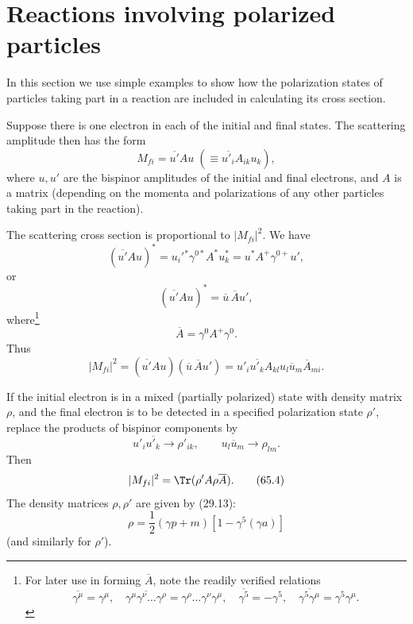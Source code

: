 \section{Reactions involving polarized particles}

In this section we use simple examples to show how the polarization states of particles taking part in a reaction are included in calculating its cross section.

Suppose there is one electron in each of the initial and final states. The scattering amplitude then has the form
\begin{equation}
M_{fi}=\overline{u'}Au\;(\equiv\overline{u'_i}A_{ik}u_k),
\tag{65.1}
\end{equation}
where $u,u'$ are the bispinor amplitudes of the initial and final electrons, and $A$ is a matrix (depending on the momenta and polarizations of any other particles taking part in the reaction).

The scattering cross section is proportional to $|M_{fi}|^2$. We have
\[
(\overline{u'}Au)^*=u_i'{}^*\gamma^{0*}A^*u_k^*=u^*A^+\gamma^{0+}u',
\]
or
\begin{equation}
(\overline{u'}Au)^*=\overline u\,\overline A u',
\tag{65.2}
\end{equation}
where\footnote{For later use in forming $\overline A$, note the readily verified relations
\begin{equation}
\overline{\gamma^\mu}=\gamma^\mu,\quad
\overline{\gamma^\mu\gamma^\nu\ldots\gamma^\rho}=\gamma^\rho\ldots\gamma^\nu\gamma^\mu,\quad
\overline{\gamma^5}=-\gamma^5,\quad
\overline{\gamma^5\gamma^\mu}=\gamma^5\gamma^\mu.
\tag{65.2a}
\end{equation}}
\[
\overline A=\gamma^0A^+\gamma^0.
\]
Thus
\begin{equation}
|M_{fi}|^2=(\overline{u'}Au)(\overline u\,\overline A u')
=u'_i\overline{u'_k}A_{kl}u_l\overline u_m\overline A_{mi}.
\tag{65.3}
\end{equation}

If the initial electron is in a mixed (partially polarized) state with density matrix $\rho$, and the final electron is to be detected in a specified polarization state $\rho'$, replace the products of bispinor components by
\[
u'_i\overline{u'_k}\to\rho'_{ik},\qquad u_l\overline u_m\to\rho_{lm}.
\]
Then
\begin{equation}
|M_{fi}|^2=\Tr(\rho'A\rho\overline A).
\tag{65.4}
\end{equation}
The density matrices $\rho,\rho'$ are given by (29.13):
\begin{equation}
\rho=\frac12(\gamma p+m)[1-\gamma^5(\gamma a)]
\tag{65.5}
\end{equation}
(and similarly for $\rho'$).

